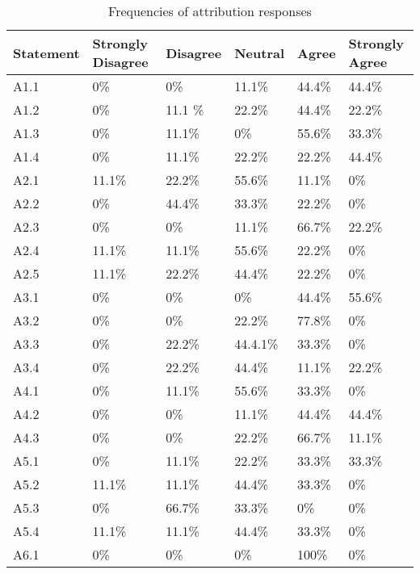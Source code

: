 \begin{longtable}{  p{}   p{}  p{}  p{}  p{}  p{} }
 \caption[Attribution Question Frequencies]{Frequencies of attribution responses} \\
	\bottomrule
    Statement  & Strongly Disagree & Disagree & Neutral & Agree & Strongly Agree \\
	\bottomrule
   A1.1 & 0\% & 0\%  & 11.1\%  &   44.4\%  & 44.4\%
   \\
   A1.2  & 0\% & 11.1 \% & 22.2\% & 44.4\% & 22.2\%
     \\
     A1.3  & 0\% & 11.1\% & 0\% & 55.6\% &  33.3\% 
    \\
     A1.4 & 0\% & 11.1\% & 22.2\% &  22.2\% & 44.4\%
      \\
      \hline
      A2.1  & 11.1\% & 22.2\% & 55.6\% & 11.1\% & 0\%
      \\
      A2.2  & 0\% & 44.4\% & 33.3\% &  22.2\% & 0\%
     \\ 
    A2.3  &  0\% & 0\% & 11.1\% & 66.7\%  &  22.2\%   
    \\ 
    A2.4  &  11.1\% & 11.1\%  & 55.6\%  &   22.2\%  & 0\%  
    \\ 
    A2.5  &  11.1\% & 22.2\%  & 44.4\%  &   22.2\%  & 0\%  
    \\
    \hline
      A3.1 & 0\% & 0\% & 0\% & 44.4\% & 55.6\% 
      \\
      A3.2 & 0\% & 0\% & 22.2\% &  77.8\% & 0\%
     \\ 
    A3.3 & 0\% & 22.2\% & 44.4.1\% & 33.3\%  &  0\%   
    \\ 
    A3.4 & 0\% & 22.2\%  & 44.4\%  & 11.1\%  & 22.2\% 
    \\
    \hline
      A4.1 & 0\% & 11.1\% & 55.6\% & 33.3\% & 0\% 
      \\
      A4.2 & 0\% & 0\% & 11.1\% &  44.4\% & 44.4\%
     \\ 
    A4.3 & 0\% & 0\% & 22.2\% & 66.7\%  &  11.1\%  
    \\
    \hline
      A5.1 & 0\% & 11.1\% & 22.2\% & 33.3\% & 33.3\% 
      \\
      A5.2 & 11.1\% & 11.1\% & 44.4\% &  33.3\% & 0\%
     \\ 
    A5.3 & 0\% & 66.7\% & 33.3\% & 0\%  &  0\%   
    \\ 
    A5.4 & 11.1\% & 11.1\%  & 44.4\%  & 33.3\%  & 0\% 
    \\
    \hline
      A6.1 & 0\% & 0\% & 0\% & 100\% & 0\% 
      \\

\end{longtable}
